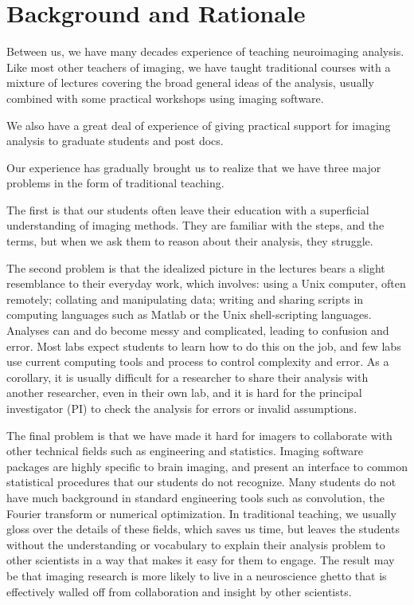 \section{Background and Rationale}\label{background}

Between us, we have many decades experience of teaching neuroimaging analysis.
Like most other teachers of imaging, we have taught traditional courses with a
mixture of lectures covering the broad general ideas of the analysis, usually
combined with some practical workshops using imaging software.

We also have a great deal of experience of giving practical support for
imaging analysis to graduate students and post docs.

Our experience has gradually brought us to realize that we have three major
problems in the form of traditional teaching.

The first is that our students often leave their education with a superficial
understanding of imaging methods.  They are familiar with the steps, and the
terms, but when we ask them to reason about their analysis, they struggle.

The second problem is that the idealized picture in the lectures bears a
slight resemblance to their everyday work, which involves: using a Unix
computer, often remotely; collating and manipulating data; writing and sharing
scripts in computing languages such as Matlab or the Unix shell-scripting
languages.  Analyses can and do become messy and complicated, leading to
confusion and error.  Most labs expect students to learn how to do this on the
job, and few labs use current computing tools and process to control 
complexity and error.  As a corollary, it is usually difficult for a
researcher to share their analysis with another researcher, even in their own
lab, and it is hard for the principal investigator (PI) to check the analysis
for errors or invalid assumptions.

The final problem is that we have made it hard for imagers to collaborate with
other technical fields such as engineering and statistics.  Imaging software
packages are highly specific to brain imaging, and present an interface to
common statistical procedures that our students do not recognize.  Many
students do not have much background in standard engineering tools such as
convolution, the Fourier transform or numerical optimization.  In traditional
teaching, we usually gloss over the details of these fields, which saves us
time, but leaves the students without the understanding or vocabulary to
explain their analysis problem to other scientists in a way that makes it easy
for them to engage.  The result may be that imaging research is more likely to
live in a neuroscience ghetto that is effectively walled off from
collaboration and insight by other scientists.

